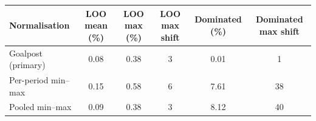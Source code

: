 \begin{tabular}{lccccc}
\toprule
Normalisation & LOO mean (\%) & LOO max (\%) & LOO max shift & Dominated (\%) & Dominated max shift \\
\midrule
Goalpost (primary) & 0.08 & 0.38 & 3 & 0.01 & 1 \\
Per-period min--max & 0.15 & 0.58 & 6 & 7.61 & 38 \\
Pooled min--max & 0.09 & 0.38 & 3 & 8.12 & 40 \\
\bottomrule
\end{tabular}
